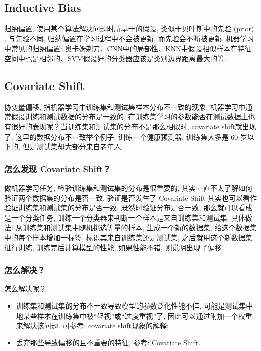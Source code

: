 \subsection{Inductive Bias}
归纳偏置, 使用某个算法解决问题时所基于的假设, 类似于贝叶斯中的先验 (prior) , 与先验不同, 归纳偏置在学习过程中不会被更新, 而先验会不断被更新. 机器学习中常见的归纳偏置: 奥卡姆剃刀、CNN中的局部性、KNN中假设相似样本在特征空间中也是相邻的、SVM假设好的分类器应该是类别边界距离最大的等. 

\subsection{Covariate Shift}
协变量偏移, 指机器学习中训练集和测试集样本分布不一致的现象. 机器学习中通常假设训练和测试数据的分布是一致的, 在训练集学习的参数能否在测试数据上也有很好的表现呢？当训练集和测试集的分布不是那么相似时, covariate shift就出现了. 这里的数据分布不一致举个例子: 训练一个健康预测器, 训练集大多是 60 岁以下的, 但是测试集却大部分来自老年人. 

\subsubsection{怎么发现 Covariate Shift？}
做机器学习任务, 检验训练集和测试集的分布是很重要的, 其实一直不太了解如何验证两个数据集的分布是否一致. 验证是否发生了 Covariate Shift 其实也可以看作验证训练集和测试集的分布是否一致. 既然时验证分布是否一致, 那么就可以看成是一个分类任务, 训练一个分类器来判断一个样本是来自训练集和测试集. 具体做法: 从训练集和测试集中随机挑选等量的样本, 生成一个新的数据集, 给这个数据集中的每个样本增加一标签, 标识其来自训练集还是测试集, 之后就用这个新数据集进行训练, 训练完后计算模型的性能, 如果性能不错, 则说明出现了偏移. 

\subsubsection{怎么解决？}
怎么解决呢？
\begin{itemize}
	\item 训练集和测试集的分布不一致导致模型的参数泛化性能不佳, 可能是测试集中地某些样本在训练集中被“轻视”或“过度重视”了, 因此可以通过附加一个权重来解决该问题. 可参考: \href{https://blog.csdn.net/mao_xiao_feng/article/details/54317852}{covariate shift现象的解释}; 
	\item 丢弃那些导致偏移的且不重要的特征, 参考: \href{https://zhuanlan.zhihu.com/p/205183444}{Covariate Shift}. 
\end{itemize}

